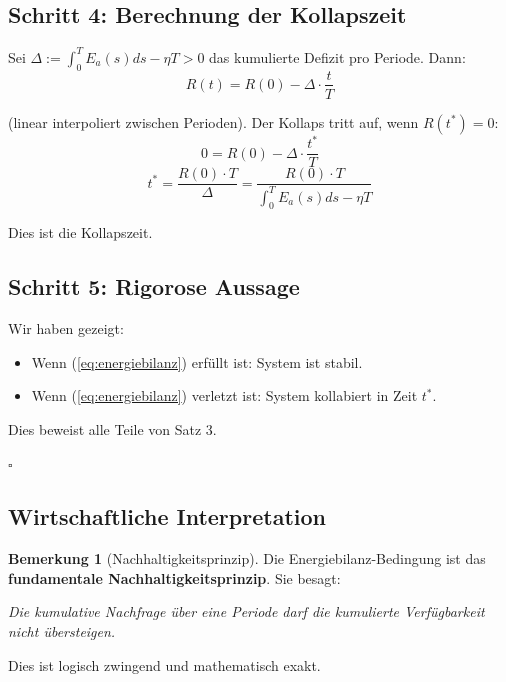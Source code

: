 \documentclass[a4paper, 12pt, twoside, openright]{report}
\theoremstyle{definition}
\theoremstyle{definition}
\newtheorem{bemerkung}{Bemerkung}[chapter]
\begin{document}
\subsection{Schritt 4: Berechnung der Kollapszeit}

Sei $\Delta := \int_0^T E_a(s) ds - \eta T > 0$ das kumulierte Defizit pro Periode. Dann:
\begin{equation}
    R(t) = R(0) - \Delta \cdot \frac{t}{T}
\end{equation}

(linear interpoliert zwischen Perioden). Der Kollaps tritt auf, wenn $R(t^*) = 0$:
\begin{equation}
    0 = R(0) - \Delta \cdot \frac{t^*}{T}
\end{equation}
\begin{equation}
    t^* = \frac{R(0) \cdot T}{\Delta} = \frac{R(0) \cdot T}{\int_0^T E_a(s) ds - \eta T}
\end{equation}

Dies ist die Kollapszeit.

\subsection{Schritt 5: Rigorose Aussage}

Wir haben gezeigt:

\begin{itemize}
    \item Wenn (\ref{eq:energiebilanz}) erfüllt ist: System ist stabil.
    \item Wenn (\ref{eq:energiebilanz}) verletzt ist: System kollabiert in Zeit $t^*$.
\end{itemize}

Dies beweist alle Teile von Satz 3.

$\square$

\subsection{Wirtschaftliche Interpretation}

\begin{bemerkung}[Nachhaltigkeitsprinzip]
    
    Die Energiebilanz-Bedingung ist das \textbf{fundamentale Nachhaltigkeitsprinzip}. Sie besagt:
    
    \begin{center}
        \textit{Die kumulative Nachfrage über eine Periode darf die kumulierte Verfügbarkeit nicht übersteigen.}
    \end{center}
    
    Dies ist logisch zwingend und mathematisch exakt.
\end{bemerkung}
\end{document}
